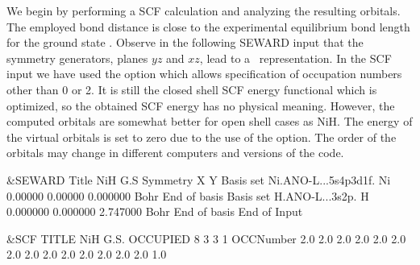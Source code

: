 We begin by performing a SCF calculation and analyzing the resulting
orbitals. The employed bond distance is close 
to the experimental equilibrium bond length for the ground state \cite{Pou:94}. 
Observe in the following SEWARD input that the symmetry generators,
planes $yz$ and $xz$, lead to a \Ctv\ representation. In the SCF
input we have used the option  which allows specification of
occupation numbers other than 0 or 2. It is still the closed shell SCF
energy functional which is optimized, so the obtained SCF energy has no
physical meaning. However, the computed orbitals are somewhat
better for open shell cases as NiH. The energy of the virtual orbitals
is set to zero due to the use of the  option.
The order of the orbitals may change in different computers
and versions of the code.

\begin{inputlisting}
 &SEWARD 
Title
 NiH G.S
Symmetry
X Y 
Basis set
Ni.ANO-L...5s4p3d1f.
Ni    0.00000   0.00000   0.000000   Bohr
End of basis
Basis set
H.ANO-L...3s2p.
H     0.000000  0.000000  2.747000   Bohr                                       
End of basis
End of Input

 &SCF
TITLE
 NiH G.S.
OCCUPIED
 8 3 3 1
OCCNumber
2.0 2.0 2.0 2.0 2.0 2.0 2.0 2.0
2.0 2.0 2.0
2.0 2.0 2.0
1.0
\end{inputlisting}

